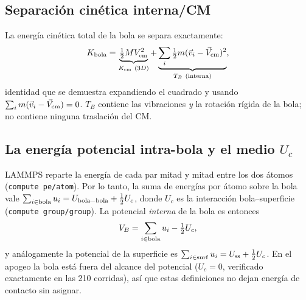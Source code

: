 \documentclass[11pt,a4paper]{article}
\begin{document}
\subsection{Separación cinética interna/CM}
La energía cinética total de la bola se separa exactamente:
\begin{equation}
K_{\rm bola} = \underbrace{\tfrac12 M V_{\rm cm}^2}_{K_{\rm cm}\ (3D)}
+ \underbrace{\sum_i \tfrac12 m (\vec v_i - \vec V_{\rm cm})^2}_{T_B\
(\text{interna})},
\end{equation}
identidad que se demuestra expandiendo el cuadrado y usando
$\sum_i m(\vec v_i - \vec V_{\rm cm}) = 0$. $T_B$ contiene las vibraciones
\emph{y} la rotación rígida de la bola; no contiene ninguna traslación del CM.

\subsection{La energía potencial intra-bola y el medio $U_c$}
LAMMPS reparte la energía de cada par mitad y mitad entre los dos átomos
(\texttt{compute pe/atom}). Por lo tanto, la suma de energías por átomo
sobre la bola vale
$\sum_{i\in \rm bola} u_i = U_{\rm bola-bola} + \tfrac12 U_c$,
donde $U_c$ es la interacción bola--superficie (\texttt{compute
group/group}). La potencial \emph{interna} de la bola es entonces
\begin{equation}
V_B = \sum_{i\in\rm bola} u_i - \tfrac12 U_c ,
\end{equation}
y análogamente la potencial de la superficie es
$\sum_{i\in\rm surf} u_i = U_{\rm ss} + \tfrac12 U_c$. En el apogeo la bola
está fuera del alcance del potencial ($U_c = 0$, verificado exactamente en
las 210 corridas), así que estas definiciones no dejan energía de contacto
sin asignar.
\end{document}
